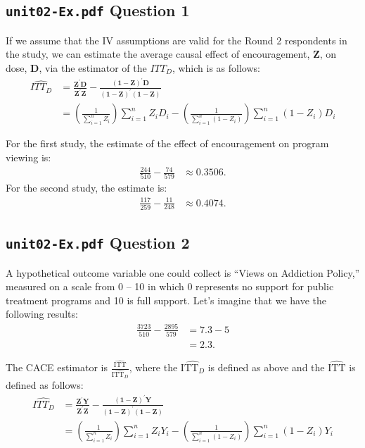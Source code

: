 \documentclass[11pt]{article}\usepackage[]{graphicx}\usepackage[]{color}
\theoremstyle{newstyle}
\begin{document}
\subsection{\texttt{unit02-Ex.pdf} Question 1}

If we assume that the IV assumptions are valid for the Round 2 respondents in the \citet{albertsonlawrence2009} study, we can estimate the average causal effect of encouragement, $\mathbf{Z}$, on dose, $\mathbf{D}$, via the estimator of the $ITT_D$, which is as follows:
\begin{align*}
\widehat{ITT_D} & = \frac{\mathbf{Z}^{\prime}\mathbf{D}}{\mathbf{Z}^{\prime}\mathbf{Z}} - \frac{\left(\mathbf{1} - \mathbf{Z}\right)^{\prime}\mathbf{D}}{\left(\mathbf{1} - \mathbf{Z}\right)^{\prime}\left(\mathbf{1} - \mathbf{Z}\right)} \\ 
& = \left(\frac{1}{\sum_{i = 1}^n Z_i}\right) \sum_{i = 1}^n Z_i D_i - \left(\frac{1}{\sum_{i = 1}^n \left(1 - Z_i\right)}\right) \sum_{i = 1}^n \left(1 - Z_i\right) D_i
\end{align*}

For the first study, the estimate of the effect of encouragement on program viewing is:
\begin{align*}
\frac{244}{510} - \frac{74}{579} & \approx 0.3506.
\end{align*}
For the second study, the estimate is:
\begin{align*}
\frac{117}{259} - \frac{11}{248} & \approx 0.4074.
\end{align*}

\subsection{\texttt{unit02-Ex.pdf} Question 2}

A hypothetical outcome variable one could collect is ``Views on Addiction Policy,'' measured on a scale from 0 -- 10 in which 0 represents no support for public treatment programs and 10 is full support. Let's imagine that we have the following results:
\begin{align*}
\frac{3723}{510} - \frac{2895}{579} & = 7.3 - 5 \\
& = 2.3.
\end{align*}

The CACE estimator is $\frac{\widehat{\text{ITT}}}{\widehat{\text{ITT}_D}}$, where the $\widehat{\text{ITT}_D}$ is defined as above and the $\widehat{\text{ITT}}$ is defined as follows:
\begin{align*}
\widehat{ITT_D} & = \frac{\mathbf{Z}^{\prime}\mathbf{Y}}{\mathbf{Z}^{\prime}\mathbf{Z}} - \frac{\left(\mathbf{1} - \mathbf{Z}\right)^{\prime}\mathbf{Y}}{\left(\mathbf{1} - \mathbf{Z}\right)^{\prime}\left(\mathbf{1} - \mathbf{Z}\right)} \\ 
& = \left(\frac{1}{\sum_{i = 1}^n Z_i}\right) \sum_{i = 1}^n Z_i Y_i - \left(\frac{1}{\sum_{i = 1}^n \left(1 - Z_i\right)}\right) \sum_{i = 1}^n \left(1 - Z_i\right) Y_i
\end{align*}
\end{document}
